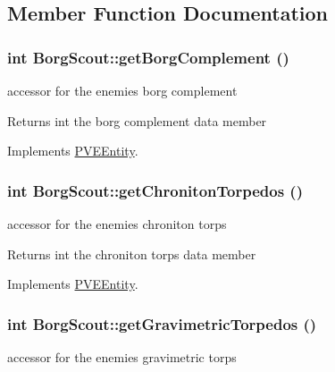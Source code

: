 \subsection{Member Function Documentation}
\hypertarget{classBorgScout_af60afb5ab8fa330ab09a841fe3cc0ae6}{
\subsubsection[{getBorgComplement}]{\setlength{\rightskip}{0pt plus 5cm}int BorgScout::getBorgComplement ()}}
\label{d5/d8c/classBorgScout_af60afb5ab8fa330ab09a841fe3cc0ae6}
accessor for the enemies borg complement

\begin{DoxyReturn}{Returns}
int the borg complement data member 
\end{DoxyReturn}


Implements \hyperlink{classPVEEntity}{PVEEntity}.

\hypertarget{classBorgScout_af4946e931ed104ab99739fb33ca15303}{
\subsubsection[{getChronitonTorpedos}]{\setlength{\rightskip}{0pt plus 5cm}int BorgScout::getChronitonTorpedos ()}}
\label{d5/d8c/classBorgScout_af4946e931ed104ab99739fb33ca15303}
accessor for the enemies chroniton torps

\begin{DoxyReturn}{Returns}
int the chroniton torps data member 
\end{DoxyReturn}


Implements \hyperlink{classPVEEntity}{PVEEntity}.

\hypertarget{classBorgScout_a5b025086c5d5f8175df3f9e581a1948e}{
\subsubsection[{getGravimetricTorpedos}]{\setlength{\rightskip}{0pt plus 5cm}int BorgScout::getGravimetricTorpedos ()}}
\label{d5/d8c/classBorgScout_a5b025086c5d5f8175df3f9e581a1948e}
accessor for the enemies gravimetric torps

